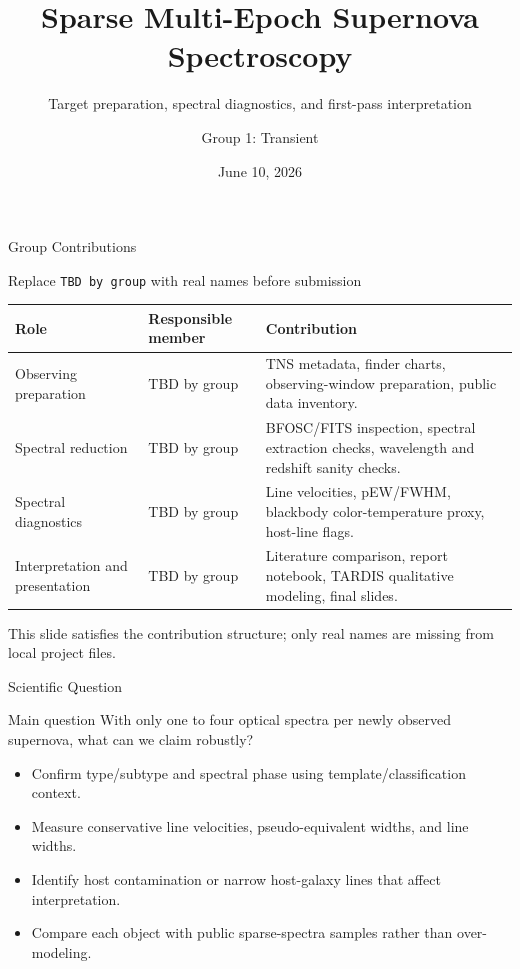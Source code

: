 \documentclass[aspectratio=169,professionalfonts]{beamer}
\title[Supernova Spectroscopy]{Sparse Multi-Epoch Supernova Spectroscopy}
\subtitle{Target preparation, spectral diagnostics, and first-pass interpretation}
\author{Group 1: Transient}
\institute{Observational Astronomy Project 2}
\date{June 10, 2026}
\begin{document}
\begin{frame}
  \titlepage
\end{frame}

\begin{frame}{Group Contributions}
  \begin{block}{Replace \texttt{TBD by group} with real names before submission}
    \scriptsize
    \begin{tabularx}{\linewidth}{@{}l l X@{}}
      \toprule
      Role & Responsible member & Contribution \\
      \midrule
      Observing preparation & TBD by group & TNS metadata, finder charts, observing-window preparation, public data inventory. \\
      Spectral reduction & TBD by group & BFOSC/FITS inspection, spectral extraction checks, wavelength and redshift sanity checks. \\
      Spectral diagnostics & TBD by group & Line velocities, pEW/FWHM, blackbody color-temperature proxy, host-line flags. \\
      Interpretation and presentation & TBD by group & Literature comparison, report notebook, TARDIS qualitative modeling, final slides. \\
      \bottomrule
    \end{tabularx}
  \end{block}
  \vspace{0.4em}
  \alert{This slide satisfies the contribution structure; only real names are missing from local project files.}
\end{frame}

\begin{frame}{Scientific Question}
  \begin{block}{Main question}
    With only one to four optical spectra per newly observed supernova, what can we claim robustly?
  \end{block}
  \begin{itemize}
    \item Confirm type/subtype and spectral phase using template/classification context.
    \item Measure conservative line velocities, pseudo-equivalent widths, and line widths.
    \item Identify host contamination or narrow host-galaxy lines that affect interpretation.
    \item Compare each object with public sparse-spectra samples rather than over-modeling.
  \end{itemize}
\end{frame}
\end{document}
